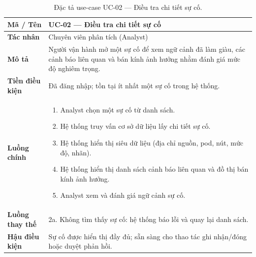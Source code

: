 \begin{table}[H]
  \centering
  \caption{Đặc tả use-case UC-02 --- Điều tra chi tiết sự cố.}
  \label{tab:uc02}
  \small
  \begin{tabularx}{\linewidth}{@{}>{\bfseries}l X@{}}
    \toprule
    Mã / Tên & UC-02 --- Điều tra chi tiết sự cố \\
    \midrule
    Tác nhân & Chuyên viên phân tích (Analyst) \\
    Mô tả & Người vận hành mở một sự cố để xem ngữ cảnh đã làm giàu, các cảnh báo liên quan và bán kính ảnh hưởng nhằm đánh giá mức độ nghiêm trọng. \\
    Tiền điều kiện & Đã đăng nhập; tồn tại ít nhất một sự cố trong hệ thống. \\
    Luồng chính &
      \begin{enumerate}[nosep,leftmargin=*]
        \item Analyst chọn một sự cố từ danh sách.
        \item Hệ thống truy vấn cơ sở dữ liệu lấy chi tiết sự cố.
        \item Hệ thống hiển thị siêu dữ liệu (địa chỉ nguồn, pod, nút, mức độ, nhãn).
        \item Hệ thống hiển thị danh sách cảnh báo liên quan và đồ thị bán kính ảnh hưởng.
        \item Analyst xem và đánh giá ngữ cảnh sự cố.
      \end{enumerate} \\
    Luồng thay thế & 2a. Không tìm thấy sự cố: hệ thống báo lỗi và quay lại danh sách. \\
    Hậu điều kiện & Sự cố được hiển thị đầy đủ; sẵn sàng cho thao tác ghi nhận/đóng hoặc duyệt phản hồi. \\
    \bottomrule
  \end{tabularx}
\end{table}

